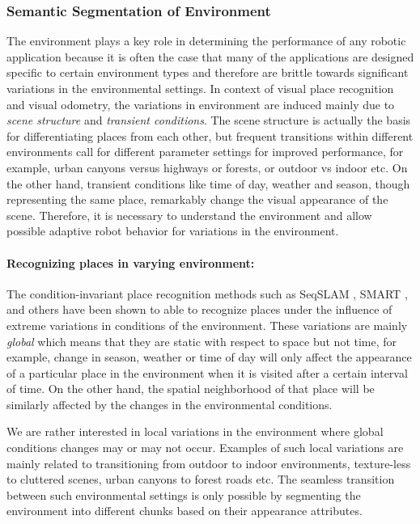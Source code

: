 \documentclass{article}
\begin{document}
\subsubsection{Semantic Segmentation of Environment}
The environment plays a key role in determining the performance of any robotic application because it is often the case that many of the applications are designed specific to certain environment types and therefore are brittle towards significant variations in the environmental settings. In context of visual place recognition and visual odometry, the variations in environment are induced mainly due to \emph{scene structure} and \emph{transient conditions}. The scene structure is actually the basis for differentiating places from each other, but frequent transitions within different environments call for different parameter settings for improved performance, for example, urban canyons versus highways or forests, or outdoor vs indoor etc. On the other hand, transient conditions like time of day, weather and season, though representing the same place, remarkably change the visual appearance of the scene. Therefore, it is necessary to understand the environment and allow possible adaptive robot behavior for variations in the environment.

\paragraph{Recognizing places in varying environment:}The condition-invariant place recognition methods such as SeqSLAM \cite{Milford2012}, SMART \cite{Pepperell2014}, and others \cite{Naseer2014,Niko2015,Maddern} have been shown to able to recognize places under the influence of extreme variations in conditions of the environment. These variations are mainly \emph{global} which means that they are static with respect to space but not time, for example, change in season, weather or time of day will only affect the appearance of a particular place in the environment when it is visited after a certain interval of time. On the other hand, the spatial neighborhood of that place will be similarly affected by the changes in the environmental conditions. 

We are rather interested in local variations in the environment where global conditions changes may or may not occur. Examples of such local variations are mainly related to transitioning from outdoor to indoor environments, texture-less to cluttered scenes, urban canyons to forest roads etc. The seamless transition between such environmental settings is only possible by segmenting the environment into different chunks based on their appearance attributes.
\end{document}
